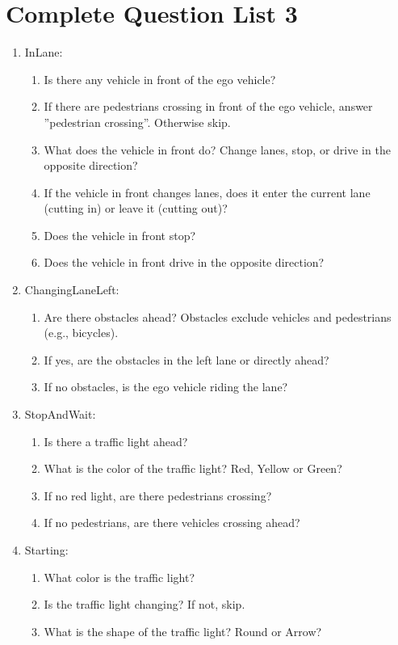 \documentclass[lettersize,journal]{IEEEtran}
\begin{document}
\section{Complete Question List 3}
\label{appendix:qa_list3}
\begin{enumerate}
    \item InLane:
    \begin{enumerate}
        \item Is there any vehicle in front of the ego vehicle?
        \item If there are pedestrians crossing in front of the ego vehicle, answer ”pedestrian crossing”. Otherwise skip.
        \item What does the vehicle in front do? Change lanes, stop, or drive in the opposite direction?
        \item If the vehicle in front changes lanes, does it enter the current lane (cutting in) or leave it (cutting out)?
        \item Does the vehicle in front stop?
        \item Does the vehicle in front drive in the opposite direction?
    \end{enumerate}
    \item ChangingLaneLeft:
        \begin{enumerate}
            \item Are there obstacles ahead? Obstacles exclude vehicles and pedestrians (e.g., bicycles).
            \item If yes, are the obstacles in the left lane or directly ahead?
            \item If no obstacles, is the ego vehicle riding the lane?
        \end{enumerate}
    \item StopAndWait:
    \begin{enumerate}
        \item Is there a traffic light ahead?
        \item What is the color of the traffic light? Red, Yellow or Green?
        \item If no red light, are there pedestrians crossing?
        \item If no pedestrians, are there vehicles crossing ahead? 
    \end{enumerate}

    \item Starting:
    \begin{enumerate}
        \item What color is the traffic light?
        \item Is the traffic light changing? If not, skip.
        \item What is the shape of the traffic light? Round or Arrow?
    \end{enumerate}


\end{enumerate}
\end{document}
